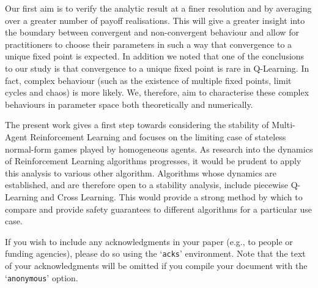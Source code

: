\documentclass[sigconf,anonymous]{aamas}
\begin{document}
Our first aim is to verify the analytic result at a finer resolution and by averaging over a greater number of payoff realisations. This will give a greater insight into the boundary between convergent and non-convergent behaviour and allow for practitioners to choose their parameters in such a way that convergence to a unique fixed point is expected. In addition we noted that one of the conclusions to our study is that convergence to a unique fixed point is rare in Q-Learning. In fact, complex behaviour (such as the existence of multiple fixed points, limit cycles and chaos) is more likely. We, therefore, aim to characterise these complex behaviours in parameter space both theoretically and numerically.

The present work gives a first step towards considering the stability of Multi-Agent Reinforcement Learning and focuses on the limiting case of stateless normal-form games played by homogeneous agents. As research into the dynamics of Reinforcement Learning algorithms progresses, it would be prudent to apply this analysis to various other algorithm. Algorithms whose dynamics are established, and are therefore open to a stability analysis, include piecewise Q-Learning and Cross Learning. This would provide a strong method by which to compare and provide safety guarantees to different algorithms for a particular use case. 



\begin{acks}
If you wish to include any acknowledgments in your paper (e.g., to 
people or funding agencies), please do so using the `\texttt{acks}' 
environment. Note that the text of your acknowledgments will be omitted
if you compile your document with the `\texttt{anonymous}' option.
\end{acks}



 


\end{document}
